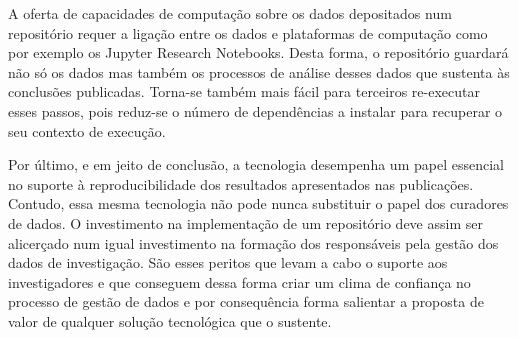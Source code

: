 \documentclass[sigconf,nonacm]{acmart}
\begin{document}
A oferta de capacidades de computação sobre os dados depositados num repositório requer a ligação entre os dados e plataformas de computação como por exemplo os Jupyter Research Notebooks. Desta forma, o repositório guardará não só os dados mas também os processos de análise desses dados que sustenta às conclusões publicadas. Torna-se também mais fácil para terceiros re-executar esses passos, pois reduz-se o número de dependências a instalar para recuperar o seu contexto de execução.

Por último, e em jeito de conclusão, a tecnologia desempenha um papel essencial no suporte à reproducibilidade dos resultados apresentados nas publicações. Contudo, essa mesma tecnologia não pode nunca substituir o papel dos curadores de dados. O investimento na implementação de um repositório deve assim ser alicerçado num igual investimento na formação dos responsáveis pela gestão dos dados de investigação. São esses peritos que levam a cabo o suporte aos investigadores e que conseguem dessa forma criar um clima de confiança no processo de gestão de dados e por consequência forma salientar a proposta de valor de qualquer solução tecnológica que o sustente.





\end{document}
